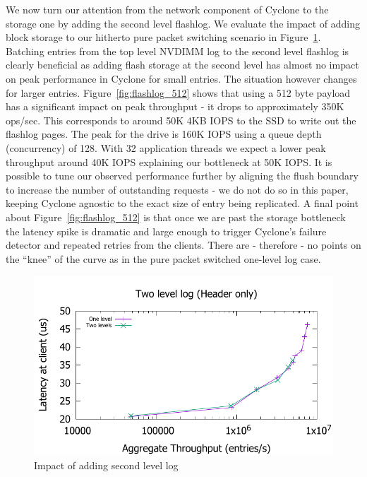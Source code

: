 \documentclass[pageno]{jpaper}
\begin{document}
We now turn our attention from the network component of Cyclone to the storage
one by adding the second level flashlog. We evaluate the impact of adding
block storage to our hitherto pure packet switching scenario in
Figure~\ref{fig:flashlog}. Batching entries from the top level NVDIMM log to the
second level flashlog is clearly beneficial as adding flash storage at the
second level has almost no impact on peak performance in Cyclone for small
entries. The situation however changes for larger
entries. Figure~\ref{fig:flashlog_512} shows that using a 512 byte payload has a
significant impact on peak throughput - it drops to approximately 350K
ops/sec. This corresponds to around 50K 4KB IOPS to the SSD to write out the
flashlog pages. The peak for the drive is 160K IOPS using a queue depth
(concurrency) of 128. With 32 application threads we expect a lower peak
throughput around 40K IOPS explaining our bottleneck at 50K IOPS.  It is
possible to tune our observed performance further by aligning the flush boundary
to increase the number of outstanding requests - we do not do so in this paper,
keeping Cyclone agnostic to the exact size of entry being replicated. A final
point about Figure~\ref{fig:flashlog_512} is that once we are past the storage
bottleneck the latency spike is dramatic and large enough to trigger Cyclone's
failure detector and repeated retries from the clients. There are - therefore -
no points on the ``knee'' of the curve as in the pure packet switched one-level
log case.

\begin{figure}
\includegraphics[scale=0.6]{results2/flashlog.pdf}
\caption{Impact of adding second level log}
\label{fig:flashlog}
\end{figure}
\end{document}
